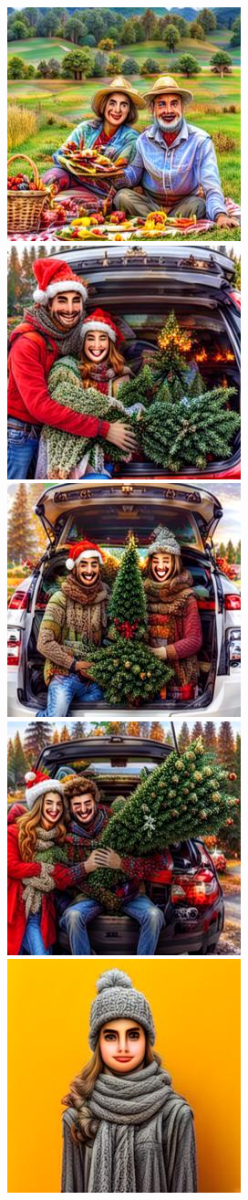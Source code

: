 \begin{figure}[h!]
\begin{subfigure}[t]{0.32\linewidth}
    	\includegraphics[width=0.32\linewidth]{figs/samples_appendix_4/draft1k_cfg_2_ode_prompt_51_image_2.jpg}\\ 
    	\includegraphics[width=0.32\linewidth]{figs/samples_appendix_4/draft1k_cfg_2_ode_prompt_58_image_0.jpg}\;%
    	\includegraphics[width=0.32\linewidth]{figs/samples_appendix_4/draft1k_cfg_2_ode_prompt_58_image_1.jpg}\;%
    	\includegraphics[width=0.32\linewidth]{figs/samples_appendix_4/draft1k_cfg_2_ode_prompt_58_image_2.jpg}\\ 
    	\includegraphics[width=0.32\linewidth]{figs/samples_appendix_4/draft1k_cfg_2_ode_prompt_61_image_0.jpg}\;%

\end{subfigure}
\end{figure}
